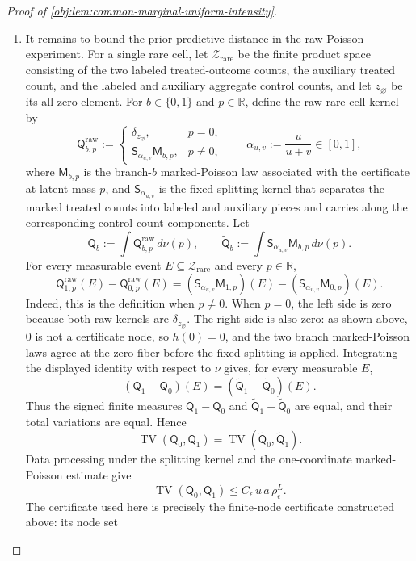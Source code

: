\begin{proof}[Proof of \cref{obj:lem:common-marginal-uniform-intensity}]
\begin{enumerate}
\item It remains to bound the prior-predictive distance in the raw Poisson experiment. For a single rare cell, let \(\mathcal Z_{\mathrm{rare}}\) be the finite product space consisting of the two labeled treated-outcome counts, the auxiliary treated count, and the labeled and auxiliary aggregate control counts, and let \(z_{\varnothing}\) be its all-zero element. For \(b\in\{0,1\}\) and \(p\in\mathbb R\), define the raw rare-cell kernel by
\[
\mathsf Q^{\mathrm{raw}}_{b,p}
:=
\begin{cases}
\delta_{z_{\varnothing}}, & p=0,\\
\mathsf S_{\alpha_{u,v}}\mathsf M_{b,p}, & p\ne0,
\end{cases}
\qquad
\alpha_{u,v}:=\frac{u}{u+v}\in[0,1],
\]
where \(\mathsf M_{b,p}\) is the branch-\(b\) marked-Poisson law associated with the certificate at latent mass \(p\), and \(\mathsf S_{\alpha_{u,v}}\) is the fixed splitting kernel that separates the marked treated counts into labeled and auxiliary pieces and carries along the corresponding control-count components. Let
\[
\mathsf Q_b:=\int \mathsf Q^{\mathrm{raw}}_{b,p}\,d\nu(p),
\qquad
\widetilde{\mathsf Q}_b
:=\int \mathsf S_{\alpha_{u,v}}\mathsf M_{b,p}\,d\nu(p).
\]
For every measurable event \(E\subseteq\mathcal Z_{\mathrm{rare}}\) and every \(p\in\mathbb R\),
\[
\mathsf Q^{\mathrm{raw}}_{1,p}(E)-\mathsf Q^{\mathrm{raw}}_{0,p}(E)
=
(\mathsf S_{\alpha_{u,v}}\mathsf M_{1,p})(E)
-(\mathsf S_{\alpha_{u,v}}\mathsf M_{0,p})(E).
\]
Indeed, this is the definition when \(p\ne0\). When \(p=0\), the left side is zero because both raw kernels are \(\delta_{z_{\varnothing}}\). The right side is also zero: as shown above, \(0\) is not a certificate node, so \(h(0)=0\), and the two branch marked-Poisson laws agree at the zero fiber before the fixed splitting is applied. Integrating the displayed identity with respect to \(\nu\) gives, for every measurable \(E\),
\[
(\mathsf Q_1-\mathsf Q_0)(E)
=
(\widetilde{\mathsf Q}_1-\widetilde{\mathsf Q}_0)(E).
\]
Thus the signed finite measures \(\mathsf Q_1-\mathsf Q_0\) and \(\widetilde{\mathsf Q}_1-\widetilde{\mathsf Q}_0\) are equal, and their total variations are equal. Hence
\[
\operatorname{TV}(\mathsf Q_0,\mathsf Q_1)
=
\operatorname{TV}(\widetilde{\mathsf Q}_0,\widetilde{\mathsf Q}_1).
\]
Data processing under the splitting kernel and the one-coordinate marked-Poisson estimate give
\[
\operatorname{TV}(\mathsf Q_0,\mathsf Q_1)
\le
\bar C_\epsilon\,u\,a\,\rho_\epsilon^L .
\]
The certificate used here is precisely the finite-node certificate constructed above: its node set

\end{enumerate}
\end{proof}
